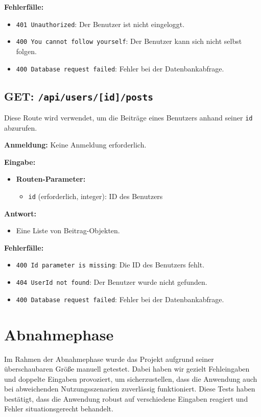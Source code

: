 \documentclass[a4paper,12pt]{article}
\begin{document}
\textbf{Fehlerfälle:}
\begin{itemize}
    \item \texttt{401 Unauthorized}:
        Der Benutzer ist nicht eingeloggt.
    \item \texttt{400 You cannot follow yourself}:
        Der Benutzer kann sich nicht selbst folgen.
    \item \texttt{400 Database request failed}:
        Fehler bei der Datenbankabfrage.
\end{itemize}

\subsection{GET: \texttt{/api/users/[id]/posts}}

Diese Route wird verwendet, um die Beiträge eines Benutzers anhand seiner
\texttt{id} abzurufen.

\textbf{Anmeldung:} Keine Anmeldung erforderlich.

\textbf{Eingabe:}
\begin{itemize}
    \item \textbf{Routen-Parameter:}
    \begin{itemize}
        \item \texttt{id} (erforderlich, integer):
            ID des Benutzers
    \end{itemize}
\end{itemize}

\textbf{Antwort:}
\begin{itemize}
    \item Eine Liste von Beitrag-Objekten.
\end{itemize}

\textbf{Fehlerfälle:}
\begin{itemize}
    \item \texttt{400 Id parameter is missing}:
        Die ID des Benutzers fehlt.
    \item \texttt{404 UserId not found}:
        Der Benutzer wurde nicht gefunden.
    \item \texttt{400 Database request failed}:
        Fehler bei der Datenbankabfrage.
\end{itemize}

\newpage \section{Abnahmephase}

Im Rahmen der Abnahmephase wurde das Projekt aufgrund seiner überschaubaren
Größe manuell getestet. Dabei haben wir gezielt Fehleingaben und doppelte
Eingaben provoziert, um sicherzustellen, dass die Anwendung auch bei
abweichenden Nutzungsszenarien zuverlässig funktioniert. Diese Tests haben
bestätigt, dass die Anwendung robust auf verschiedene Eingaben reagiert und
Fehler situationsgerecht behandelt.
\end{document}
